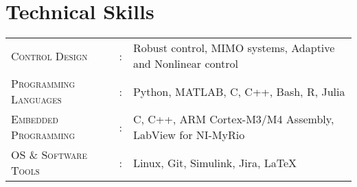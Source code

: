 \documentclass[letterpaper,10pt]{article}
\begin{document}
\section{Technical Skills}
\begin{tabular}{l c l}
\textsc{Control Design}&:& Robust control, MIMO systems, Adaptive and Nonlinear control\\
	\textsc{Programming Languages}&:& Python, MATLAB, C, C++, Bash, R, Julia\\
    \textsc{Embedded Programming}&:& C, C++, ARM Cortex-M3/M4 Assembly, LabView for NI-MyRio\\
	\textsc{OS \& Software Tools}&:& Linux, Git, Simulink, Jira, \LaTeX\\
\end{tabular}
\end{document}
